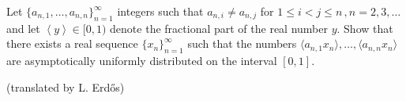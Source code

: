 Let $\{a_{n,1},\ldots, a_{n,n} \}_{n=1}^{\infty}$ integers such that $a_{n,i}\neq a_{n,j}$ for $1\le i<j\le n\, , n=2,3,\ldots$ and let $\left\langle y\right\rangle\in [0,1)$ denote the fractional part of the real number $y$. Show that there exists a real sequence $\{ x_n\}_{n=1}^{\infty}$ such that the numbers $\langle a_{n,1}x_n \rangle, \ldots, \langle a_{n,n}x_n \rangle$ are asymptotically uniformly distributed on the interval $[0,1]$.

(translated by L. Erdős)
